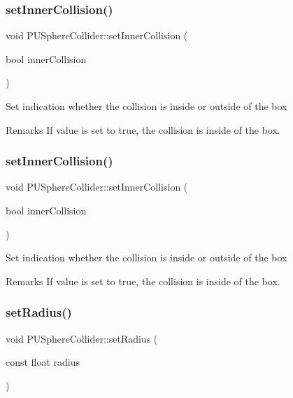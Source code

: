 \subsubsection{\texorpdfstring{set\+Inner\+Collision()}{setInnerCollision()}\hspace{0.1cm}{\footnotesize\ttfamily [1/2]}}
{\footnotesize\ttfamily void P\+U\+Sphere\+Collider\+::set\+Inner\+Collision (\begin{DoxyParamCaption}\item[{bool}]{inner\+Collision }\end{DoxyParamCaption})}

Set indication whether the collision is inside or outside of the box \begin{DoxyRemark}{Remarks}
If value is set to true, the collision is inside of the box. 
\end{DoxyRemark}
\mbox{\label{classPUSphereCollider_afd5152513a9f7e83e4da0fb6f817daf3}} 
\subsubsection{\texorpdfstring{set\+Inner\+Collision()}{setInnerCollision()}\hspace{0.1cm}{\footnotesize\ttfamily [2/2]}}
{\footnotesize\ttfamily void P\+U\+Sphere\+Collider\+::set\+Inner\+Collision (\begin{DoxyParamCaption}\item[{bool}]{inner\+Collision }\end{DoxyParamCaption})}

Set indication whether the collision is inside or outside of the box \begin{DoxyRemark}{Remarks}
If value is set to true, the collision is inside of the box. 
\end{DoxyRemark}
\mbox{\label{classPUSphereCollider_ab3063655165ec183d0e0c8d49a61e29c}} 
\subsubsection{\texorpdfstring{set\+Radius()}{setRadius()}\hspace{0.1cm}{\footnotesize\ttfamily [1/2]}}
{\footnotesize\ttfamily void P\+U\+Sphere\+Collider\+::set\+Radius (\begin{DoxyParamCaption}\item[{const float}]{radius }\end{DoxyParamCaption})}

